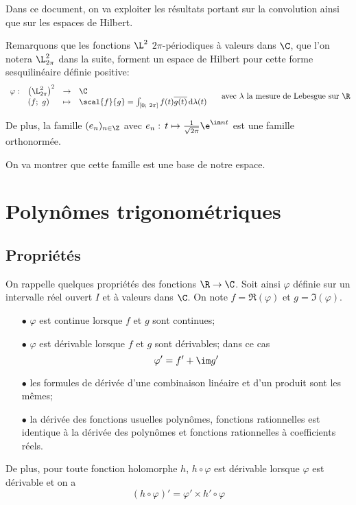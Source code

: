 
Dans ce document, on va exploiter les résultats portant sur la convolution ainsi que sur les espaces de Hilbert.

Remarquons que les fonctions $\L^2$ $2\pi$-périodiques à valeurs dans $\C$, que l'on notera $\L^2_{2\pi}$ dans la suite, forment un espace de Hilbert pour cette forme sesquilinéaire définie positive:
\[
\begin{array}{llcl}
\varphi: & \left ( \L^2_{2\pi}\right )^2 & \to & \C \\
 & (f;~g) & \mapsto & \scal{f}{g} = \int_{[0;~2\pi]} f(t) \overline{g(t)} \, \mathrm{d} \lambda(t) 
\end{array} \quad \text{ avec $\lambda$ la mesure de Lebesgue sur $\R$}
\]

De plus, la famille $(e_n)_{n \in \Z}$ avec $e_n: \, t \mapsto \frac{1}{\sqrt{2\pi}} \e^{\im n t}$ est une famille orthonormée.

On va montrer que cette famille est une base de notre espace.


\section{Polynômes trigonométriques}

\subsection{Propriétés}

On rappelle quelques propriétés des fonctions $\R \to \C$. Soit ainsi $\varphi$ définie sur un intervalle réel ouvert $I$ et à valeurs dans $\C$. On note $f = \Re(\varphi)$ et $g = \Im(\varphi)$.
\begin{itemize}
\item[$\bullet$]
$\varphi$ est continue lorsque $f$ et $g$ sont continues;
\item[$\bullet$]
$\varphi$ est dérivable lorsque $f$ et $g$ sont dérivables; dans ce cas
\[
\varphi' = f' + \im g'
\]
\item[$\bullet$]
les formules de dérivée d'une combinaison linéaire et d'un produit sont les mêmes;
\item[$\bullet$]
la dérivée des fonctions usuelles polynômes, fonctions rationnelles est identique à la dérivée des polynômes et fonctions rationnelles à coefficients réels.
\end{itemize}


De plus, pour toute fonction holomorphe $h$, $h \circ \varphi$ est dérivable lorsque $\varphi$ est dérivable et on a
\[
(h \circ \varphi)' = \varphi' \times h' \circ \varphi
\]

